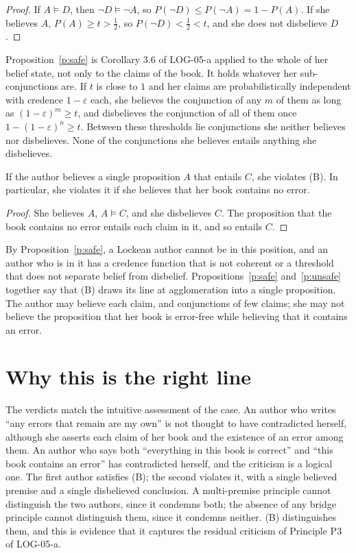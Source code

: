 \documentclass{situationist-preprint}
\begin{document}
\begin{proof}
If $A \models D$, then $\neg D \models \neg A$, so $P(\neg D) \leq P(\neg A) = 1 - P(A)$. If she believes $A$, $P(A) \geq t > \tfrac12$, so $P(\neg D) < \tfrac12 < t$, and she does not disbelieve $D$.
\end{proof}

Proposition~\ref{p:safe} is Corollary 3.6 of LOG-05-a applied to the whole of her belief state, not only to the claims of the book. It holds whatever her sub-conjunctions are. If $t$ is close to $1$ and her claims are probabilistically independent with credence $1 - \varepsilon$ each, she believes the conjunction of any $m$ of them as long as $(1-\varepsilon)^m \geq t$, and disbelieves the conjunction of all of them once $1 - (1 - \varepsilon)^n \geq t$. Between these thresholds lie conjunctions she neither believes nor disbelieves. None of the conjunctions she believes entails anything she disbelieves.

\begin{proposition}\label{p:unsafe}
If the author believes a single proposition $A$ that entails $C$, she violates (B). In particular, she violates it if she believes that her book contains no error.
\end{proposition}

\begin{proof}
She believes $A$, $A \models C$, and she disbelieves $C$. The proposition that the book contains no error entails each claim in it, and so entails $C$.
\end{proof}

By Proposition~\ref{p:safe}, a Lockean author cannot be in this position, and an author who is in it has a credence function that is not coherent or a threshold that does not separate belief from disbelief. Propositions~\ref{p:safe} and~\ref{p:unsafe} together say that (B) draws its line at agglomeration into a single proposition. The author may believe each claim, and conjunctions of few claims; she may not believe the proposition that her book is error-free while believing that it contains an error.

\section{Why this is the right line}

The verdicts match the intuitive assessment of the case. An author who writes \enquote{any errors that remain are my own} is not thought to have contradicted herself, although she asserts each claim of her book and the existence of an error among them. An author who says both \enquote{everything in this book is correct} and \enquote{this book contains an error} has contradicted herself, and the criticism is a logical one. The first author satisfies (B); the second violates it, with a single believed premise and a single disbelieved conclusion. A multi-premise principle cannot distinguish the two authors, since it condemns both; the absence of any bridge principle cannot distinguish them, since it condemns neither. (B) distinguishes them, and this is evidence that it captures the residual criticism of Principle P3 of LOG-05-a.
\end{document}
